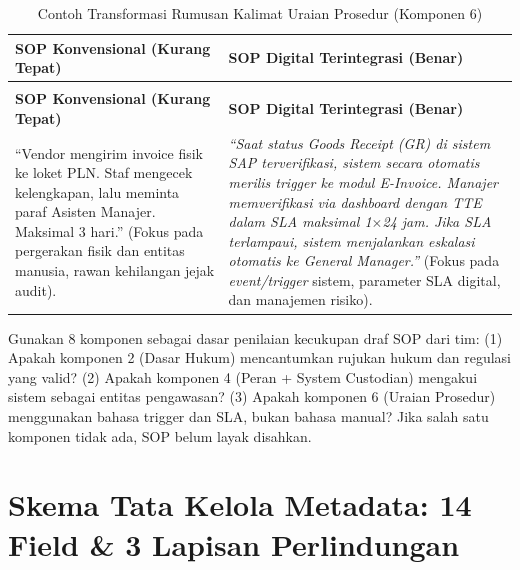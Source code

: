 \documentclass[12pt,a4paper]{report}
\begin{document}
\begingroup
\small
\begin{xltabular}{\textwidth}{@{} >{\raggedright\arraybackslash}X >{\raggedright\arraybackslash}X @{}}
\caption{Contoh Transformasi Rumusan Kalimat Uraian Prosedur (Komponen 6)}\\
\toprule
\textbf{SOP Konvensional (Kurang Tepat)} & \textbf{SOP Digital Terintegrasi (Benar)} \\
\midrule
\endfirsthead

\\
\toprule
\textbf{SOP Konvensional (Kurang Tepat)} & \textbf{SOP Digital Terintegrasi (Benar)} \\
\midrule
\endhead

\bottomrule
\endfoot

``Vendor mengirim invoice fisik ke loket PLN. Staf mengecek kelengkapan, lalu meminta paraf Asisten Manajer. Maksimal 3 hari.'' \newline \newline
(Fokus pada pergerakan fisik dan entitas manusia, rawan kehilangan jejak audit).
&
\textit{``Saat status \textit{Goods Receipt (GR)} di sistem SAP terverifikasi, sistem secara otomatis merilis \textit{trigger} ke modul E-Invoice. Manajer memverifikasi via \textit{dashboard} dengan TTE dalam SLA maksimal 1$\times$24 jam. Jika SLA terlampaui, sistem menjalankan eskalasi otomatis ke General Manager.''} \newline \newline
(Fokus pada \textit{event/trigger} sistem, parameter SLA digital, dan manajemen risiko). \\
\bottomrule
\end{xltabular}
\endgroup

\begin{plnbox}
Gunakan 8 komponen sebagai dasar penilaian kecukupan draf SOP dari tim: (1) Apakah komponen 2 (Dasar Hukum) mencantumkan rujukan hukum dan regulasi yang valid? (2) Apakah komponen 4 (Peran + System Custodian) mengakui sistem sebagai entitas pengawasan? (3) Apakah komponen 6 (Uraian Prosedur) menggunakan bahasa trigger dan SLA, bukan bahasa manual? Jika salah satu komponen tidak ada, SOP belum layak disahkan.
\end{plnbox}


\section{Skema Tata Kelola Metadata: 14 Field \& 3 Lapisan Perlindungan}
\end{document}
